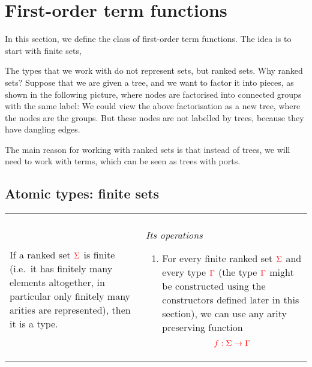 \section{First-order term functions}
In this section, we define the class of first-order term functions. The idea is to start with finite sets, 

The types that we work with do not represent sets, but ranked sets. Why ranked sets? Suppose that we are given a tree, and we want to factor it into pieces, as shown in the following picture, where nodes are factorised into connected groups with the same label:
We could view the above factorisation as a new tree, where the nodes are the groups. But these nodes are not labelled by trees, because they have dangling edges. 

The main reason for working with ranked sets is that  instead of trees, we will need to work with terms, which can be seen as trees with ports. 

\newcommand{\datatypefigure}[2]
{
    \noindent \begin{tabular}[t]{ll}
        \begin{minipage}[t]{.35\textwidth}
            \emph{The type constructor}\\
            #1
        \end{minipage}
        &
        \begin{minipage}[t]{.60\textwidth}
            \emph{Its operations}
            \begin{enumerate}
                \setcounter{enumi}{\value{typeoperations}}
                #2
                \setcounter{typeoperations}{\value{enumi}}
            \end{enumerate}        
        \end{minipage}
    \end{tabular} 

    \smallskip
}

\subsection{Atomic types: finite sets}

\datatypefigure
{
    If a ranked set ${\color{red}{\Sigma}}$ is finite (i.e.~it has finitely many elements altogether, in particular only finitely many arities are represented), then it is a type. 
}
{
    \item For every finite ranked set ${\color{red}{\Sigma}}$ and every type ${\color{red}{\Gamma}}$ (the type ${\color{red}{\Gamma}}$ might be constructed using the constructors defined later in this section), we can use any arity preserving function
    \begin{align*}
    {\color{red}{ f : \Sigma \to \Gamma}}
    \end{align*}
}

